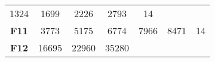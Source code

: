 \documentclass[12pt,a4paper]{article}
\begin{document}
\begin{longtable}[c]{@{}ccccccc@{}}
\begin{minipage}[t]{0.08\columnwidth}\centering\strut
1324
\strut\end{minipage} &
\begin{minipage}[t]{0.09\columnwidth}\centering\strut
1699
\strut\end{minipage} &
\begin{minipage}[t]{0.10\columnwidth}\centering\strut
2226
\strut\end{minipage} &
\begin{minipage}[t]{0.11\columnwidth}\centering\strut
2793
\strut\end{minipage} &
\begin{minipage}[t]{0.07\columnwidth}\centering\strut
14
\strut\end{minipage}\tabularnewline
\begin{minipage}[t]{0.11\columnwidth}\centering\strut
\textbf{F11}
\strut\end{minipage} &
\begin{minipage}[t]{0.08\columnwidth}\centering\strut
3773
\strut\end{minipage} &
\begin{minipage}[t]{0.08\columnwidth}\centering\strut
5175
\strut\end{minipage} &
\begin{minipage}[t]{0.09\columnwidth}\centering\strut
6774
\strut\end{minipage} &
\begin{minipage}[t]{0.10\columnwidth}\centering\strut
7966
\strut\end{minipage} &
\begin{minipage}[t]{0.11\columnwidth}\centering\strut
8471
\strut\end{minipage} &
\begin{minipage}[t]{0.07\columnwidth}\centering\strut
14
\strut\end{minipage}\tabularnewline
\begin{minipage}[t]{0.11\columnwidth}\centering\strut
\textbf{F12}
\strut\end{minipage} &
\begin{minipage}[t]{0.08\columnwidth}\centering\strut
16695
\strut\end{minipage} &
\begin{minipage}[t]{0.08\columnwidth}\centering\strut
22960
\strut\end{minipage} &
\begin{minipage}[t]{0.09\columnwidth}\centering\strut
35280
\strut\end{minipage} &

\end{longtable}
\end{document}
